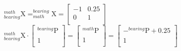 \documentclass[12pt,fleqn]{standalone}
\begin{document}
\begin{preview}
\Large
${\displaystyle _{bearing}^{math}\textrm{X}=_{math}^{bearing}\textrm{X}=
\begin{bmatrix}
-1 & 0.25 \\
0 & 1 \\
\end{bmatrix}}
$\\
${\displaystyle _{bearing}^{math}\textrm{X} \cdot \begin{bmatrix}
		_{}^{bearing}\textrm{P} \\
		1 \\
	\end{bmatrix}=\begin{bmatrix}
		_{}^{math}\textrm{P} \\
		1 \\
\end{bmatrix}=\begin{bmatrix}
-_{}^{bearing}\textrm{P}+0.25 \\
1 \\
\end{bmatrix}}$
\end{preview}
\end{document}
